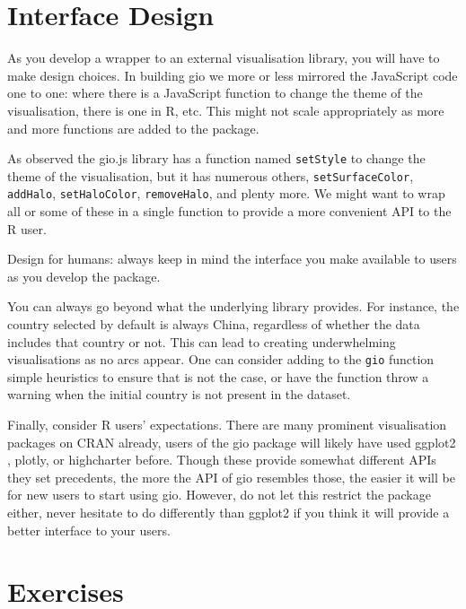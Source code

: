 \documentclass[
]{krantz}
\makeatletter
\newenvironment{kframe}{%
\medskip{}
\setlength{\fboxsep}{.8em}
 \def\at@end@of@kframe{}%
 \ifinner\ifhmode%
  \def\at@end@of@kframe{\end{minipage}}%
  \begin{minipage}{\columnwidth}%
 \fi\fi%
 \def\FrameCommand##1{\hskip\@totalleftmargin \hskip-\fboxsep
 \colorbox{shadecolor}{##1}\hskip-\fboxsep
     \hskip-\linewidth \hskip-\@totalleftmargin \hskip\columnwidth}%
 \MakeFramed {\advance\hsize-\width
   \@totalleftmargin\z@ \linewidth\hsize
   \@setminipage}}%
 {\par\unskip\endMakeFramed%
 \at@end@of@kframe}
\newenvironment{rmdblock}[1]
  {
  \begin{itemize}
  \renewcommand{\labelitemi}{
    \raisebox{-.7\height}[0pt][0pt]{
      {\setkeys{Gin}{width=3em,keepaspectratio}\texttt{[image: images/\#1]}}
    }
  }
  \setlength{\fboxsep}{1em}
  \begin{kframe}
  \item
  }
  {
  \end{kframe}
  \end{itemize}
  }
\newenvironment{rmdnote}
  {\begin{rmdblock}{note}}
  {\end{rmdblock}}
\makeatother
\begin{document}
\hypertarget{widgets-final-interface}{%
\section{Interface Design}\label{widgets-final-interface}}

As you develop a wrapper to an external visualisation library, you will have to make design choices. In building gio we more or less mirrored the JavaScript code one to one: where there is a JavaScript function to change the theme of the visualisation, there is one in R, etc. This might not scale appropriately as more and more functions are added to the package.

As observed the gio.js library has a function named \texttt{setStyle} to change the theme of the visualisation, but it has numerous others, \texttt{setSurfaceColor}, \texttt{addHalo}, \texttt{setHaloColor}, \texttt{removeHalo}, and plenty more. We might want to wrap all or some of these in a single function to provide a more convenient API to the R user.

\begin{rmdnote}
Design for humans: always keep in mind the interface you make available
to users as you develop the package.
\end{rmdnote}

You can always go beyond what the underlying library provides. For instance, the country selected by default is always China, regardless of whether the data includes that country or not. This can lead to creating underwhelming visualisations as no arcs appear. One can consider adding to the \texttt{gio} function simple heuristics to ensure that is not the case, or have the function throw a warning when the initial country is not present in the dataset.

Finally, consider R users' expectations. There are many prominent visualisation packages on CRAN already, users of the gio package will likely have used ggplot2 \citep{R-ggplot2}, plotly, or highcharter before. Though these provide somewhat different APIs they set precedents, the more the API of gio resembles those, the easier it will be for new users to start using gio. However, do not let this restrict the package either, never hesitate to do differently than ggplot2 if you think it will provide a better interface to your users.

\hypertarget{widgets-final-exercises}{%
\section{Exercises}\label{widgets-final-exercises}}
\end{document}
